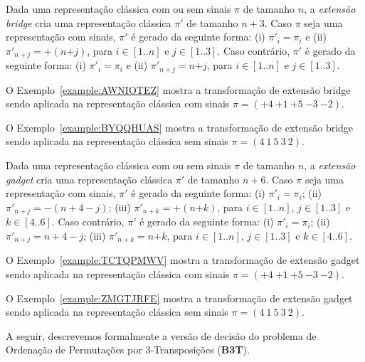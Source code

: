 \begin{definition}
Dada uma representação clássica com ou sem sinais $\pi$ de tamanho $n$, a \emph{extensão bridge} cria uma representação clássica $\pi'$ de tamanho $n + 3$. Caso $\pi$ seja uma representação com sinais, $\pi'$ é gerado da seguinte forma: (i) $\pi'_{i} = \pi_i$ e (ii) $\pi'_{n+j} = +(n{+j})$, para $i \in [1..n]$ e $j \in [1..3]$. Caso contrário, $\pi'$ é gerado da seguinte forma: (i) $\pi'_{i} = \pi_i$ e (ii) $\pi'_{n+j} = n{+j}$, para $i \in [1..n]$ e $j \in [1..3]$.
\end{definition}

O Exemplo~\ref{example:AWNIOTEZ} mostra a transformação de extensão bridge sendo aplicada na representação clássica com sinais $\pi=({+4}~{+1}~{+5}~{-3}~{-2})$.



O Exemplo~\ref{example:BYQQHUAS} mostra a transformação de extensão bridge sendo aplicada na representação clássica sem sinais $\pi=(4~1~5~3~2)$.



\begin{definition}
Dada uma representação clássica com ou sem sinais $\pi$ de tamanho $n$, a \emph{extensão gadget} cria uma representação clássica $\pi'$ de tamanho $n + 6$. Caso $\pi$ seja uma representação com sinais, $\pi'$ é gerado da seguinte forma: (i) $\pi'_{i} = \pi_i$; (ii) $\pi'_{n+j} = -(n+4-j)$; (iii) $\pi'_{n+k} = +(n{+k})$, para $i \in [1..n]$, $j \in [1..3]$ e $k \in [4..6]$. Caso contrário, $\pi'$ é gerado da seguinte forma: (i) $\pi'_{i} = \pi_i$; (ii) $\pi'_{n+j} = n+4-j$; (iii) $\pi'_{n+k} = n{+k}$, para $i \in [1..n]$, $j \in [1..3]$ e $k \in [4..6]$.
\end{definition}

O Exemplo~\ref{example:TCTQPMWV} mostra a transformação de extensão gadget sendo aplicada na representação clássica com sinais $\pi=({+4}~{+1}~{+5}~{-3}~{-2})$.



O Exemplo~\ref{example:ZMGTJRFE} mostra a transformação de extensão gadget sendo aplicada na representação clássica sem sinais $\pi=(4~1~5~3~2)$.

\pagebreak


A seguir, descrevemos formalmente a versão de decisão do problema de Ordenação de Permutações por 3-Transposições (\textbf{B3T}).

\begin{decision}
\end{decision}

